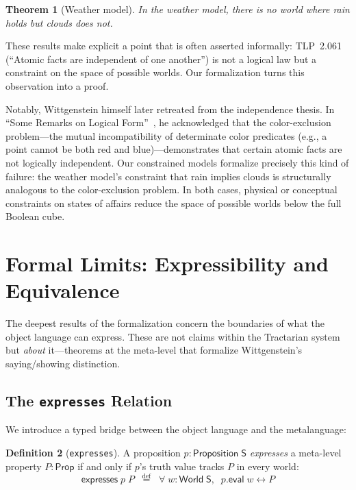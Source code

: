 \documentclass[10pt, letterpaper]{article}
\newtheorem{theorem}{Theorem}[section]
\theoremstyle{definition}
\newtheorem{definition}[theorem]{Definition}
\theoremstyle{remark}
\newcommand{\Sach}{\mathsf{S}}
\newcommand{\World}{\mathsf{World}}
\newcommand{\Prop}{\mathsf{Prop}}
\newcommand{\eval}{\mathsf{eval}}
\newcommand{\expresses}{\mathsf{expresses}}
\begin{document}
\begin{theorem}[Weather model]
\label{thm:weather}
In the weather model, there is no world where rain holds but
clouds does not.
\end{theorem}

\noindent
These results make explicit a point that is often asserted
informally: TLP~2.061 (``Atomic facts are independent of one
another'') is not a logical law but a constraint on the space of
possible worlds.  Our formalization turns this observation into a
proof.

Notably, Wittgenstein himself later retreated from the
independence thesis.  In ``Some Remarks on Logical
Form''~\cite{wittgenstein1929}, he acknowledged that the
color-exclusion problem---the mutual incompatibility of
determinate color predicates (e.g., a point cannot be both red
and blue)---demonstrates that certain atomic facts are not
logically independent.  Our constrained models formalize
precisely this kind of failure: the weather model's constraint
that rain implies clouds is structurally analogous to the
color-exclusion problem.  In both cases, physical or conceptual
constraints on states of affairs reduce the space of possible
worlds below the full Boolean cube.

\section{Formal Limits: Expressibility and Equivalence}
\label{sec:limits}

The deepest results of the formalization concern the boundaries
of what the object language can express.  These are not claims
within the Tractarian system but \emph{about} it---theorems at
the meta-level that formalize Wittgenstein's saying/showing
distinction.

\subsection{The \texttt{expresses} Relation}
\label{sec:expresses}

We introduce a typed bridge between the object language and the
metalanguage:

\begin{definition}[\texttt{expresses}]
\label{def:expresses}
A proposition $p : \mathsf{Proposition}\;\Sach$ \emph{expresses}
a meta-level property $P : \Prop$ if and only if $p$'s truth
value tracks $P$ in every world:
\[
  \expresses\;p\;P \;\;\stackrel{\mathrm{def}}{=}\;\;
  \forall\;w : \World\;\Sach,\;\; p.\eval\;w \leftrightarrow P
\]
\end{definition}
\end{document}
